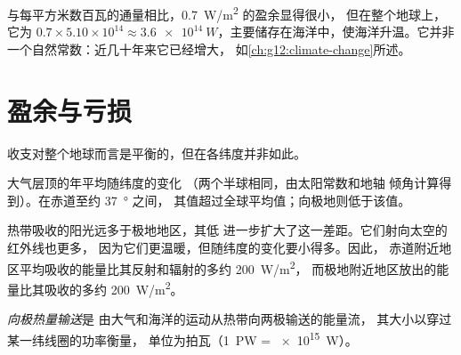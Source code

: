 \begin{remark}[失衡]\label{rem:g10:earth-energy-budget:imbalance}
与每平方米数百瓦的通量相比，\qty{0.7}{W/m^2} 的盈余显得很小，
但在整个地球上，它为 $0.7 \times 5.10\times10^{14} \approx
\qty{3.6e14}{W}$，主要储存在海洋中，使海洋升温。它并非
一个自然常数：近几十年来它已经增大，
如\cref{ch:g12:climate-change}所述。
\end{remark}

\section{盈余与亏损}

收支对整个地球而言是平衡的，但在各纬度并非如此。

\begin{omfigure}

{\small 大气层顶的年平均随纬度的变化
（两个半球相同，由太阳常数和地轴
倾角计算得到）。在赤道至约 \qty{37}{\degree} 之间，
其值超过全球平均值；向极地则低于该值。}
\end{omfigure}

热带吸收的阳光远多于极地地区，其低
进一步扩大了这一差距。它们射向太空的红外线也更多，
因为它们更温暖，但随纬度的变化要小得多。因此，
赤道附近地区平均吸收的能量比其反射和辐射的多约 \qty{200}{W/m^2}，
而极地附近地区放出的能量比其吸收的多约
\qty{200}{W/m^2}。

\begin{definition}[向极热量输送]\label{def:g10:earth-energy-budget:heat-transport}
\emph{向极热量输送}是
由大气和海洋的运动从热带向两极输送的能量流，
其大小以穿过某一纬线圈的功率衡量，
单位为拍瓦（\qty{1}{PW} = \qty{e15}{W}）。
\end{definition}

